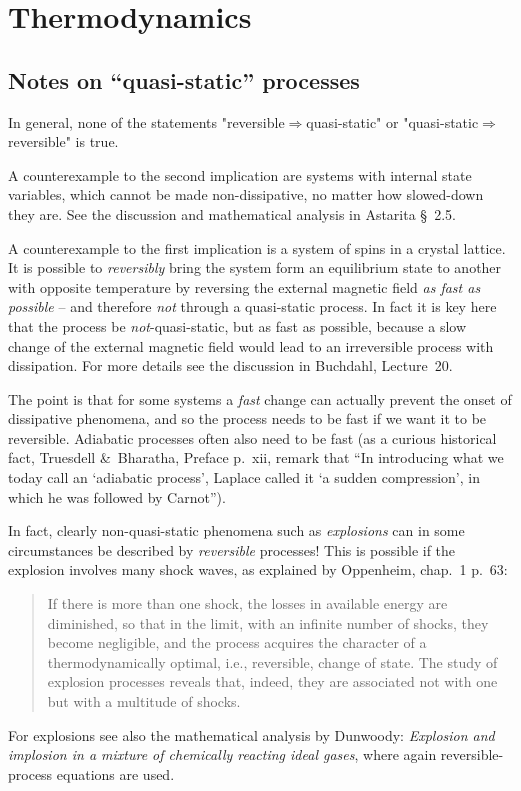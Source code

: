 \documentclass[a4paper,12pt,%
onecolumn,oneside,titlepage,%
british%
]{memoir}
\newcommand*{\amp}{\&}
\renewcommand*{\|}[1][]{\nonscript\:#1\vert\nonscript\:\mathopen{}}
\newcommand*{\sect}{\S}%
\begin{document}
\printpagenotes*
\clearpage

\chapter{Thermodynamics}
\label{cha:thermodynamics}

\section{Notes on \enquote{quasi-static} processes}
\label{sec:quasistatic}

In general, none of the statements "reversible${}\Rightarrow{}$quasi-static" or "quasi-static${}\Rightarrow{}$reversible"
is true.

A counterexample to the second implication are systems with internal state variables, which cannot be made non-dissipative, no matter how slowed-down they are. See the discussion and mathematical analysis in Astarita \sect~2.5.


A counterexample to the first implication is a system of spins in a crystal lattice. It is possible to \emph{reversibly} bring the system form an equilibrium state to another with opposite temperature by reversing the external magnetic field \emph{as fast as possible} – and therefore \emph{not} through a quasi-static process. In fact it is key here that the process be \emph{not}-quasi-static, but as fast as possible, because a slow change of the external magnetic field would lead to an irreversible process with dissipation. For more details see the discussion in Buchdahl, Lecture~20.

The point is that for some systems a \emph{fast} change can actually prevent the onset of dissipative phenomena, and so the process needs to be fast if we want it to be reversible. Adiabatic processes often also need to be fast (as a curious historical fact, Truesdell \amp\ Bharatha, Preface p.~xii, remark that \enquote{In introducing what we today call an `adiabatic process', Laplace called it `a sudden compression', in which he was followed by Carnot}).

In fact, clearly non-quasi-static phenomena such as \emph{explosions} can in some circumstances be described by \emph{reversible} processes! This is possible if the explosion involves many shock waves, as explained by Oppenheim, chap.~1 p.~63:
\begin{quote}
  If there is more than one shock, the losses in available energy are diminished, so that in the limit, with an infinite number of shocks, they become negligible, and the process acquires the character of a thermodynamically optimal, i.e., reversible, change of state. The study of explosion processes reveals that, indeed, they are associated not with one but with a multitude of shocks.
\end{quote}
For explosions see also the mathematical analysis by Dunwoody: \emph{Explosion and implosion in a mixture of chemically reacting ideal gases}, where again reversible-process equations are used.
\end{document}
